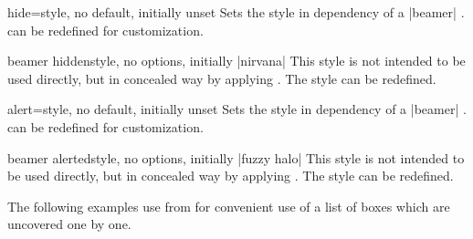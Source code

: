 \begin{docTcbKey}[][doc new={2019-03-01}]{hide}{=}{style, no default, initially unset}
Sets the  style in dependency of
a |beamer| .
 can be redefined for customization.
\end{docTcbKey}

\begin{docTcbKey}[][doc new={2019-03-01}]{beamer hidden}{}{style, no options, initially |nirvana|}
This style is not intended to be used directly, but in concealed way by applying
. The style can be redefined.
\begin{dispListing}
\end{dispListing}
\end{docTcbKey}

\begin{docTcbKey}[][doc new={2019-03-01}]{alert}{=}{style, no default, initially unset}
Sets the  style in dependency of
a |beamer| .
 can be redefined for customization.
\end{docTcbKey}


\begin{docTcbKey}[][doc new={2019-03-01}]{beamer alerted}{}{style, no options, initially |fuzzy halo|}
This style is not intended to be used directly, but in concealed way by applying
. The style can be redefined.
\begin{dispListing}
\end{dispListing}
\end{docTcbKey}


\clearpage

The following examples use  from  for
convenient use of a list of boxes which are uncovered one by one.


